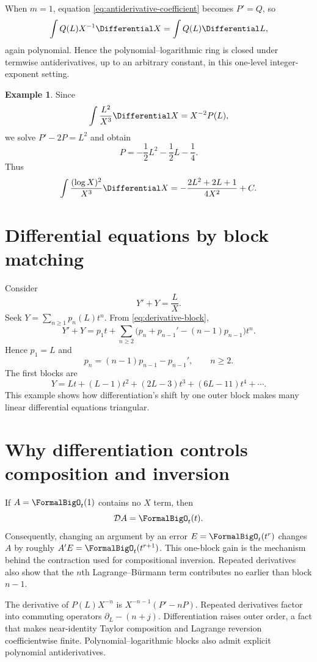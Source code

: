 \documentclass[11pt,oneside]{book}
\theoremstyle{definition}
\newtheorem{example}[theorem]{Example}
\theoremstyle{remark}
\newcommand{\D}{\mathcal D}
\begin{document}
When $m=1$, equation \eqref{eq:antiderivative-coefficient} becomes $P'=Q$,
so
\[
 \int Q(L)X^{-1}\Differential X=\int Q(L)\Differential L,
\]
again polynomial.  Hence the polynomial--logarithmic ring is closed under
termwise antiderivatives, up to an arbitrary constant, in this one-level
integer-exponent setting.

\begin{example}
Since
\[
 \int \frac{L^2}{X^3}\Differential X=X^{-2}P(L),
\]
we solve $P'-2P=L^2$ and obtain
\[
 P=-\frac12L^2-\frac12L-\frac14.
\]
Thus
\[
 \int \frac{(\log X)^2}{X^3}\Differential X
 =-\frac{2L^2+2L+1}{4X^2}+C.
\]
\end{example}

\section{Differential equations by block matching}
Consider
\begin{equation}\label{eq:simple-ode}
 Y'+Y=\frac{L}{X}.
\end{equation}
Seek $Y=\sum_{n\ge1}p_n(L)t^n$.  From
\eqref{eq:derivative-block},
\[
 Y'+Y=p_1t+\sum_{n\ge2}
 \bigl(p_n+p_{n-1}'-(n-1)p_{n-1}\bigr)t^n.
\]
Hence $p_1=L$ and
\[
 p_n=(n-1)p_{n-1}-p_{n-1}',\qquad n\ge2.
\]
The first blocks are
\[
 Y=Lt+(L-1)t^2+(2L-3)t^3+(6L-11)t^4+\cdots.
\]
This example shows how differentiation's shift by one outer block makes many
linear differential equations triangular.

\section{Why differentiation controls composition and inversion}
If $A=\FormalBigO_t(1)$ contains no $X$ term, then
\begin{equation}\label{eq:A-derivative-small}
 \D A=\FormalBigO_t(t).
\end{equation}
Consequently, changing an argument by an error $E=\FormalBigO_t(t^r)$ changes
$A$ by roughly $A'E=\FormalBigO_t(t^{r+1})$.  This one-block gain is the mechanism
behind the contraction used for compositional inversion.  Repeated derivatives
also show that the $n$th Lagrange--B\"urmann term contributes no earlier than
block $n-1$.

\begin{summarybox}
The derivative of $P(L)X^{-n}$ is
$X^{-n-1}(P'-nP)$.  Repeated derivatives factor into commuting operators
$\partial_L-(n+j)$.  Differentiation raises outer order, a fact that makes
near-identity Taylor composition and Lagrange reversion coefficientwise
finite.  Polynomial--logarithmic blocks also admit explicit polynomial
antiderivatives.
\end{summarybox}
\end{document}
